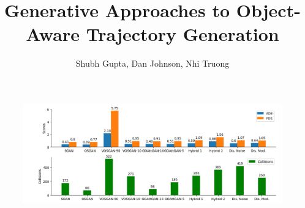 \documentclass[final]{beamer}
\title{\Huge Generative Approaches to Object-Aware Trajectory Generation}
\author{\LARGE Shubh Gupta, Dan Johnson, Nhi Truong}
\institute{\Large Stanford University, CS 236} %
\begin{document}




\begin{frame}[t] %
\vspace*{10cm}
\begin{figure}[H]
	\centering
	\includegraphics[width=\linewidth]{results.png}
	\label{fig:}
\end{figure}
\end{frame} %
\end{document}
